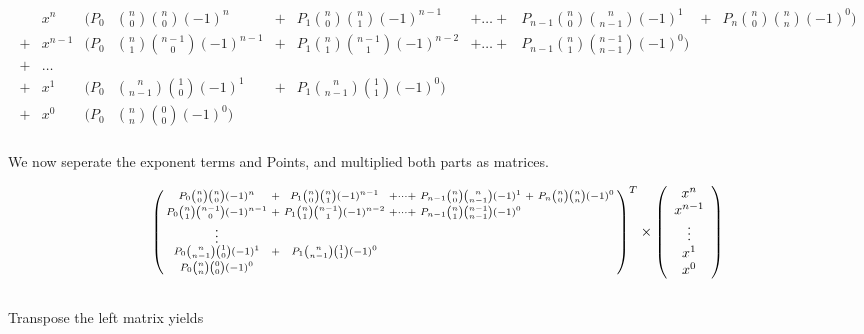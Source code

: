 \begin{gather}
    \begin{align*}
          & x^{n}   & (P_0 & {n \choose 0}{n \choose 0}(-1)^{n}     & + & P_1 {n \choose 0}{n \choose 1}(-1)^{n-1}   & + \dots + & P_{n-1} {n \choose 0}{n \choose n-1}(-1)^{1}    & + & P_{n} {n \choose 0}{n \choose n}(-1)^{0}) \\
        + & x^{n-1} & (P_0 & {n \choose 1}{n-1 \choose 0}(-1)^{n-1} & + & P_1 {n \choose 1}{n-1 \choose 1}(-1)^{n-2} & + \dots + & P_{n-1} {n \choose 1}{n-1 \choose n-1}(-1)^{0})                                                 \\
        + & \dots                                                                                                                                                                                                                  \\
        + & x^{1}   & (P_0 & {n \choose n-1}{1 \choose 0}(-1)^{1}   & + & P_1 {n \choose n-1}{1 \choose 1}(-1)^{0})                                                                                                                \\
        + & x^{0}   & (P_0 & {n \choose n}{0 \choose 0}(-1)^{0})
    \end{align*}
\end{gather}
\\ We now seperate the exponent terms and Points, and multiplied both parts as matrices.

\begin{equation*}
    \begin{psmallmatrix}
        P_0 {n \choose 0}{n \choose 0}(-1)^{n} &+&  P_1 {n \choose 0}{n \choose 1}(-1)^{n-1}  &+ \dots + &P_{n-1} {n \choose 0}{n \choose n-1}(-1)^{1}  &+&  P_{n} {n \choose 0}{n \choose n}(-1)^{0} \\
        P_0 {n \choose 1}{n-1 \choose 0}(-1)^{n-1}  &+&  P_1 {n \choose 1}{n-1 \choose 1}(-1)^{n-2} &+ \dots + &P_{n-1} {n \choose 1}{n-1 \choose n-1}(-1)^{0}                               \\
        \vdots                                                                                                                                  \\
        P_0 {n \choose n-1}{1 \choose 0}(-1)^{1} &+& P_1 {n \choose n-1}{1 \choose 1}(-1)^{0}                                                                                   \\
        P_0 {n \choose n}{0 \choose 0}(-1)^{0}
    \end{psmallmatrix}^T
    \times
    \left(
    \begin{array}{c}
        x^{n}   \\
        x^{n-1} \\
        \vdots  \\
        x^{1}   \\
        x^{0}   \\
    \end{array}
    \right)
\end{equation*}
\\ Transpose the left matrix yields


